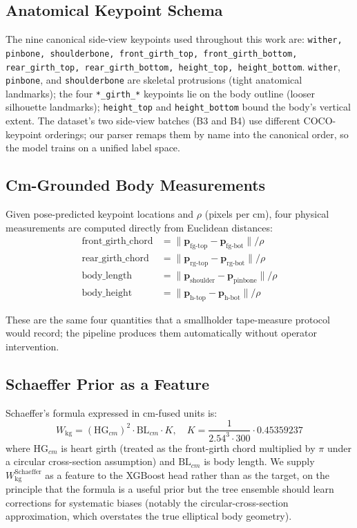 \documentclass[conference]{IEEEtran}
\begin{document}
\subsection{Anatomical Keypoint Schema}

The nine canonical side-view keypoints used throughout this work are: \texttt{wither, pinbone, shoulderbone, front\_girth\_top, front\_girth\_bottom, rear\_girth\_top, rear\_girth\_bottom, height\_top, height\_bottom}. \texttt{wither}, \texttt{pinbone}, and \texttt{shoulderbone} are skeletal protrusions (tight anatomical landmarks); the four \texttt{*\_girth\_*} keypoints lie on the body outline (looser silhouette landmarks); \texttt{height\_top} and \texttt{height\_bottom} bound the body's vertical extent. The dataset's two side-view batches (B3 and B4) use different COCO-keypoint orderings; our parser remaps them by name into the canonical order, so the model trains on a unified label space.

\subsection{Cm-Grounded Body Measurements}

Given pose-predicted keypoint locations and $\rho$ (pixels per cm), four physical measurements are computed directly from Euclidean distances:
\begin{align}
\text{front\_girth\_chord} &= \|\mathbf{p}_{\text{fg-top}} - \mathbf{p}_{\text{fg-bot}}\| / \rho \\
\text{rear\_girth\_chord}  &= \|\mathbf{p}_{\text{rg-top}} - \mathbf{p}_{\text{rg-bot}}\| / \rho \\
\text{body\_length}        &= \|\mathbf{p}_{\text{shoulder}} - \mathbf{p}_{\text{pinbone}}\| / \rho \\
\text{body\_height}        &= \|\mathbf{p}_{\text{h-top}} - \mathbf{p}_{\text{h-bot}}\| / \rho
\end{align}

These are the same four quantities that a smallholder tape-measure protocol would record; the pipeline produces them automatically without operator intervention.

\subsection{Schaeffer Prior as a Feature}

Schaeffer's formula expressed in cm-fused units is:
\begin{equation}
W_{\text{kg}} = (\text{HG}_{cm})^2 \cdot \text{BL}_{cm} \cdot K,
\quad K = \frac{1}{2.54^3 \cdot 300} \cdot 0.45359237
\end{equation}
where $\text{HG}_{cm}$ is heart girth (treated as the front-girth chord multiplied by $\pi$ under a circular cross-section assumption) and $\text{BL}_{cm}$ is body length. We supply $W_{\text{kg}}^{\text{Schaeffer}}$ as a feature to the XGBoost head rather than as the target, on the principle that the formula is a useful prior but the tree ensemble should learn corrections for systematic biases (notably the circular-cross-section approximation, which overstates the true elliptical body geometry).
\end{document}
